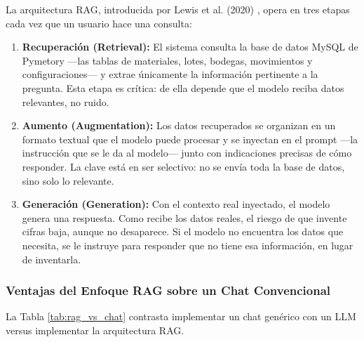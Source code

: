 La arquitectura RAG, introducida por Lewis et al. (2020) \cite{rag_lewis2020}, opera en tres etapas cada vez que un usuario hace una consulta:

\begin{enumerate}
    \item \textbf{Recuperación (Retrieval):} El sistema consulta la base de datos MySQL de Pymetory ---las tablas de materiales, lotes, bodegas, movimientos y configuraciones--- y extrae únicamente la información pertinente a la pregunta. Esta etapa es crítica: de ella depende que el modelo reciba datos relevantes, no ruido.
    
    \item \textbf{Aumento (Augmentation):} Los datos recuperados se organizan en un formato textual que el modelo puede procesar y se inyectan en el prompt ---la instrucción que se le da al modelo--- junto con indicaciones precisas de cómo responder. La clave está en ser selectivo: no se envía toda la base de datos, sino solo lo relevante.
    
    \item \textbf{Generación (Generation):} Con el contexto real inyectado, el modelo genera una respuesta. Como recibe los datos reales, el riesgo de que invente cifras baja, aunque no desaparece. Si el modelo no encuentra los datos que necesita, se le instruye para responder que no tiene esa información, en lugar de inventarla.
\end{enumerate}

\subsubsection{Ventajas del Enfoque RAG sobre un Chat Convencional}

La Tabla \ref{tab:rag_vs_chat} contrasta implementar un chat genérico con un LLM versus implementar la arquitectura RAG.

